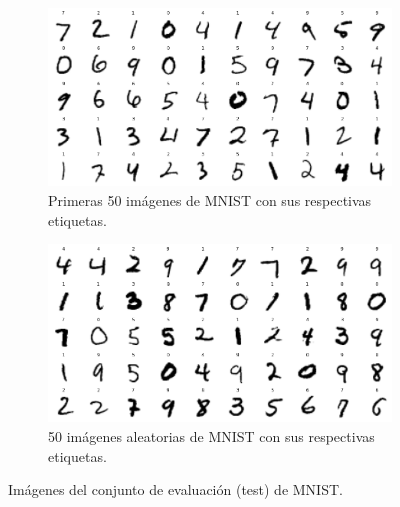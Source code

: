 \begin{figure}[h!]
    \centering
    \begin{subfigure}[b]{0.45\textwidth}
        \centering
        \includegraphics[width=\textwidth]{images/mnist/mnist_test_first50.png}
        \caption{Primeras 50 imágenes de MNIST con sus respectivas etiquetas.}
        \label{mnist5}
    \end{subfigure}
    \hspace{1cm}
    \begin{subfigure}[b]{0.45\textwidth}
        \centering
        \includegraphics[width=\textwidth]{images/mnist/mnist_test_random.png}
        \caption{50 imágenes aleatorias de MNIST con sus respectivas etiquetas.}
        \label{mnist6}
    \end{subfigure}
    \caption{Imágenes del conjunto de evaluación (test) de MNIST.}
    \label{mnist_test}
\end{figure}

